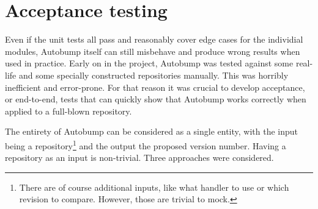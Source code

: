 \documentclass{l4proj}
\begin{document}
\section{Acceptance testing}

Even if the unit tests all pass and reasonably cover edge cases for
the individial modules, Autobump itself can still misbehave and
produce wrong results when used in practice. Early on in the project,
Autobump was tested against some real-life and some specially
constructed repositories manually. This was horribly inefficient and
error-prone. For that reason it was crucial to develop acceptance, or
end-to-end, tests that can quickly show that Autobump works correctly
when applied to a full-blown repository.

The entirety of Autobump can be considered as a single entity, with the
input being a repository\footnote{There are of course additional
inputs, like what handler to use or which revision to compare.
However, those are trivial to mock.} and the output the proposed
version number. Having a repository as an input is non-trivial.
Three approaches were considered.
\end{document}
